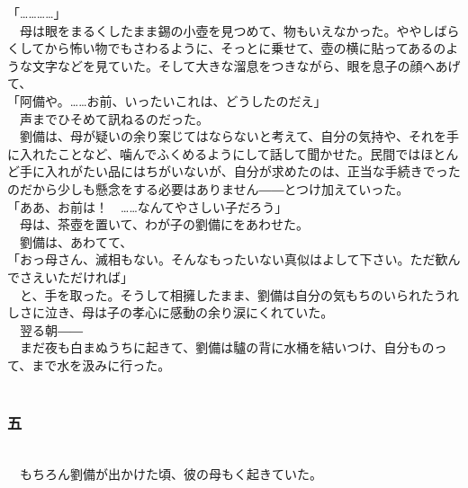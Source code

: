 \documentclass[
  paper=a5,
  fontsize=10pt,
  jafontsize=9.5pt,
  tate,                  %
  open_bracket_pos=nibu, %
]{jlreq}
\begin{document}
「…………」\\


　母は眼をまるくしたまま錫の小壺を見つめて、物もいえなかった。ややしばらくしてから怖い物でもさわるように、そっとに乗せて、壺の横に貼ってあるのような文字などを見ていた。そして大きな溜息をつきながら、眼を息子の顔へあげて、\\


「阿備や。……お前、いったいこれは、どうしたのだえ」\\


　声までひそめて訊ねるのだった。\\


　劉備は、母が疑いの余り案じてはならないと考えて、自分の気持や、それを手に入れたことなど、噛んでふくめるようにして話して聞かせた。民間ではほとんど手に入れがたい品にはちがいないが、自分が求めたのは、正当な手続きでったのだから少しも懸念をする必要はありません――とつけ加えていった。\\


「ああ、お前は！　……なんてやさしい子だろう」\\


　母は、茶壺を置いて、わが子の劉備にをあわせた。\\


　劉備は、あわてて、\\


「おっ母さん、滅相もない。そんなもったいない真似はよして下さい。ただ歓んでさえいただければ」\\


　と、手を取った。そうして相擁したまま、劉備は自分の気もちのいられたうれしさに泣き、母は子の孝心に感動の余り涙にくれていた。\\


　翌る朝――\\


　まだ夜も白まぬうちに起きて、劉備は驢の背に水桶を結いつけ、自分ものって、まで水を汲みに行った。\\

\\

\subsubsection{五}

\\


　もちろん劉備が出かけた頃、彼の母もく起きていた。\\
\end{document}
